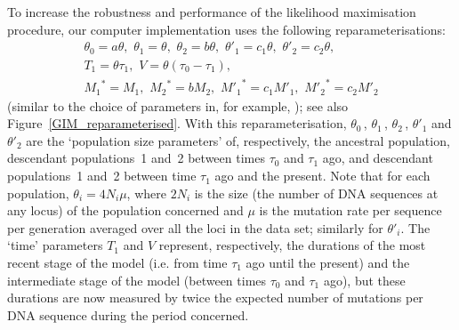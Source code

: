 \documentclass[11pt]{article}
\begin{document}
To increase the robustness and performance of the likelihood maximisation procedure, our computer implementation uses the following reparameterisations:
\begin{equation}
\begin{array}{l}
\theta_0 = a \theta,\,\,
\theta_1 = \theta,\,\,
\theta_2 = b \theta,\,\,
\theta'_1 = c_1 \theta, \,\,
\theta'_2 = c_2 \theta, \\
%
T_1 = \theta \tau_1,\,\,  
V  = \theta (\tau_0 - \tau_1),\\
{M_1}^{\!*} = M_1,\,\,
{M_2}^{\!*} = b M_2,\,\,
{M'_1}^{*} = c_1 M'_1,\,\,
{M'_2}^{*} = c_2 M'_2
\end{array}
\label{pars}
\end{equation}
(similar to the choice of parameters in, for example, \citealp{Hey2004,Zhu2012,Costa2017}); see also Figure~\ref{GIM_reparameterised}.
With this reparameterisation, $\theta_0$\,, $\theta_1$\,, $\theta_2$\,, $\theta'_1$ and $\theta'_2$ 
are the `population size parameters' of, respectively, the ancestral population, descendant populations~1 and~2 between times $\tau_0$ and $\tau_1$ ago, and descendant populations~1 and~2 between time $\tau_1$ ago and the present.
Note that for each population,
$\theta_i=4 N_i \mu$, where $2N_i$ is the size (the number of DNA sequences at any locus) of the population concerned and $\mu$ is the mutation rate per sequence per generation averaged over all the loci in the data set; similarly for $\theta'_i$. The `time' parameters $T_1$ and $V$ represent, respectively, the durations of the most recent stage of the model (i.e. from time $\tau_1$ ago until the present) and the intermediate stage of the model (between times $\tau_0$ and $\tau_1$ ago), but these durations are now measured by twice the expected number of mutations per DNA sequence during the period concerned.
\end{document}
